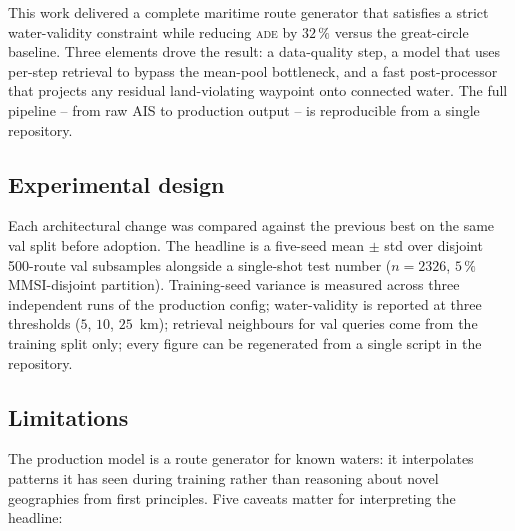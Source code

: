 \documentclass[oneside, a4paper, onecolumn, 11pt]{article}
\newcommand{\ade}{\textsc{ade}}
\begin{document}
This work delivered a complete maritime route generator that
satisfies a strict water-validity constraint while reducing \ade{}
by $32\,\%$ versus the great-circle baseline.  Three elements drove
the result: a data-quality step, a model that uses per-step
retrieval to bypass the mean-pool bottleneck, and a fast
post-processor that projects any residual land-violating waypoint
onto connected water.  The full pipeline -- from raw AIS to
production output -- is reproducible from a single repository.

\subsection{Experimental design}

Each architectural change was compared against the previous best on
the same val split before adoption.  The headline is a five-seed
mean $\pm$ std over disjoint 500-route val subsamples alongside a
single-shot test number ($n = 2326$, $5\,\%$ MMSI-disjoint
partition).  Training-seed variance is measured across three
independent runs of the production config; water-validity is
reported at three thresholds ($5$, $10$, $25$~km); retrieval
neighbours for val queries come from the training split only; every
figure can be regenerated from a single script in the repository.

\subsection{Limitations}\label{sec:limitations}

The production model is a route generator for known waters: it
interpolates patterns it has seen during training rather than
reasoning about novel geographies from first principles.  Five
caveats matter for interpreting the headline:
\end{document}
